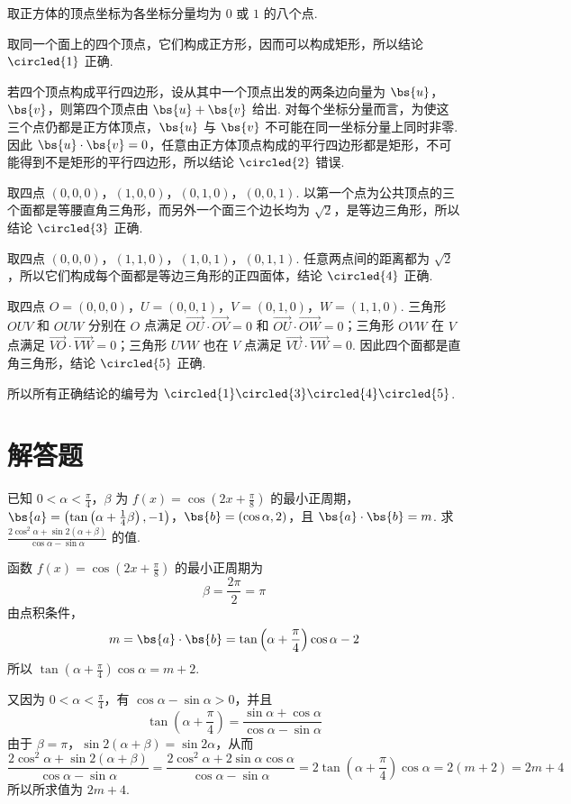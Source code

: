 \begin{solution}
取正方体的顶点坐标为各坐标分量均为 \(0\) 或 \(1\) 的八个点.

取同一个面上的四个顶点，它们构成正方形，因而可以构成矩形，所以结论 \(\circled{1}\) 正确.

若四个顶点构成平行四边形，设从其中一个顶点出发的两条边向量为 \(\bs{u}\)，\(\bs{v}\)，则第四个顶点由 \(\bs{u}+\bs{v}\) 给出. 对每个坐标分量而言，为使这三个点仍都是正方体顶点，\(\bs{u}\) 与 \(\bs{v}\) 不可能在同一坐标分量上同时非零. 因此 \(\bs{u}\cdot\bs{v}=0\)，任意由正方体顶点构成的平行四边形都是矩形，不可能得到不是矩形的平行四边形，所以结论 \(\circled{2}\) 错误.

取四点 \((0,0,0)\)，\((1,0,0)\)，\((0,1,0)\)，\((0,0,1)\). 以第一个点为公共顶点的三个面都是等腰直角三角形，而另外一个面三个边长均为 \(\sqrt{2}\)，是等边三角形，所以结论 \(\circled{3}\) 正确.

取四点 \((0,0,0)\)，\((1,1,0)\)，\((1,0,1)\)，\((0,1,1)\). 任意两点间的距离都为 \(\sqrt{2}\)，所以它们构成每个面都是等边三角形的正四面体，结论 \(\circled{4}\) 正确.

取四点 \(O=(0,0,0)\)，\(U=(0,0,1)\)，\(V=(0,1,0)\)，\(W=(1,1,0)\). 三角形 \(OUV\) 和 \(OUW\) 分别在 \(O\) 点满足 \(\overrightarrow{OU}\cdot\overrightarrow{OV}=0\) 和 \(\overrightarrow{OU}\cdot\overrightarrow{OW}=0\)；三角形 \(OVW\) 在 \(V\) 点满足 \(\overrightarrow{VO}\cdot\overrightarrow{VW}=0\)；三角形 \(UVW\) 也在 \(V\) 点满足 \(\overrightarrow{VU}\cdot\overrightarrow{VW}=0\). 因此四个面都是直角三角形，结论 \(\circled{5}\) 正确.

所以所有正确结论的编号为 \(\circled{1}\circled{3}\circled{4}\circled{5}\).
\end{solution}

\section{解答题}

\begin{problem}
已知 \(0 < \alpha < \frac{\pi}{4}\)，\(\beta\) 为 \(f(x) = \cos \left(2x + \frac{\pi}{8}\right)\) 的最小正周期，\(\bs{a} = \left(\tan \left(\alpha + \frac{1}{4}\beta\right), -1\right)\)，\(\bs{b} = (\cos \alpha, 2)\)，且 \(\bs{a} \cdot \bs{b} = m\). 求 \(\frac{2\cos^2\alpha + \sin 2(\alpha + \beta)}{\cos \alpha - \sin \alpha}\) 的值.
\end{problem}

\begin{solution}
函数 \(f(x)=\cos\left(2x+\frac{\pi}{8}\right)\) 的最小正周期为
\[
\beta=\frac{2\pi}{2}=\pi
\]
由点积条件，
\[
m=\bs{a}\cdot\bs{b}
=\tan\left(\alpha+\frac{\pi}{4}\right)\cos\alpha-2
\]
所以 \(\tan\left(\alpha+\frac{\pi}{4}\right)\cos\alpha=m+2\).

又因为 \(0<\alpha<\frac{\pi}{4}\)，有 \(\cos\alpha-\sin\alpha>0\)，并且
\[
\tan\left(\alpha+\frac{\pi}{4}\right)
=\frac{\sin\alpha+\cos\alpha}{\cos\alpha-\sin\alpha}
\]
由于 \(\beta=\pi\)，\(\sin2(\alpha+\beta)=\sin2\alpha\)，从而
\[
\frac{2\cos^2\alpha+\sin2(\alpha+\beta)}
{\cos\alpha-\sin\alpha}
=\frac{2\cos^2\alpha+2\sin\alpha\cos\alpha}
{\cos\alpha-\sin\alpha}
=2\tan\left(\alpha+\frac{\pi}{4}\right)\cos\alpha
=2(m+2)=2m+4
\]
所以所求值为 \(2m+4\).
\end{solution}

